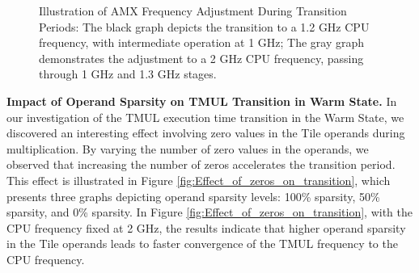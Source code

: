 \begin{figure}[h!]
\centering
{}
\caption{Illustration of AMX Frequency Adjustment During Transition Periods: The black graph depicts the transition to a 1.2 GHz CPU frequency, with intermediate operation at 1 GHz; The gray graph demonstrates the adjustment to a 2 GHz CPU frequency, passing through 1 GHz and 1.3 GHz stages.}
\label{fig:Freq_transition}
\end{figure}

\textbf{Impact of Operand Sparsity on TMUL Transition in Warm State.}
In our investigation of the TMUL execution time transition in the Warm State, we discovered an interesting effect involving zero values in the Tile operands during multiplication. By varying the number of zero values in the operands, we observed that increasing the number of zeros accelerates the transition period. This effect is illustrated in Figure \ref{fig:Effect_of_zeros_on_transition}, which presents three graphs depicting operand sparsity levels: 100\% sparsity, 50\% sparsity, and 0\% sparsity. In Figure \ref{fig:Effect_of_zeros_on_transition}, with the CPU frequency fixed at 2 GHz, the results indicate that higher operand sparsity in the Tile operands leads to faster convergence of the TMUL frequency to the CPU frequency.

